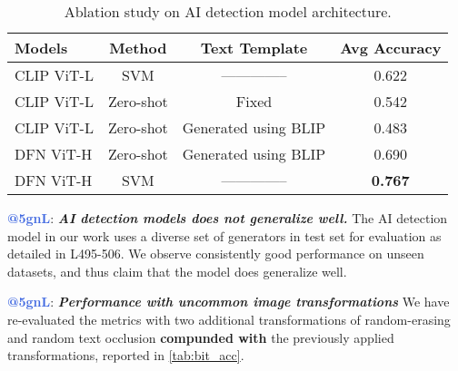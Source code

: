 \documentclass[10pt,twocolumn,letterpaper]{article}
\makeatletter
\newcommand{\rtgdr}{\textcolor{RawSienna}{\bf \textbf{@tgdr}}}
\newcommand{\rfivegnl}{\textcolor{RoyalBlue}{\bf \textbf{@5gnL}}}
\makeatother
\begin{document}
\begin{table}[h]
    \centering
    \scriptsize
    \begin{tabular}{lccc}
        \toprule
        Models & Method & Text Template & Avg Accuracy \\
        \midrule
        CLIP ViT-L & SVM & -------------- & 0.622 \\
        CLIP ViT-L & Zero-shot & Fixed & 0.542 \\
        CLIP ViT-L & Zero-shot & Generated using BLIP & 0.483 \\
        DFN ViT-H & Zero-shot & Generated using BLIP & 0.690 \\
        DFN ViT-H & SVM & -------------- & \textbf{0.767} \\
        \bottomrule
    \end{tabular}
    \vspace{-10pt}
    \caption{Ablation study on AI detection model architecture.  }
    \label{tab:ablation}
\end{table}
\vspace{-15pt}


\noindent\rfivegnl: \textbf{\emph{AI detection models does not generalize well.}} The AI detection model in our work uses a diverse set of generators in test set for evaluation as detailed in L495-506. We observe consistently good performance on unseen datasets, and thus claim that the model does generalize well.


\noindent \rfivegnl:
\textbf{\emph{Performance with uncommon image transformations}} We have re-evaluated the metrics with two additional transformations of random-erasing and random text occlusion \textbf{compunded with} the previously applied transformations, reported in \autoref{tab:bit_acc}.

\end{document}
